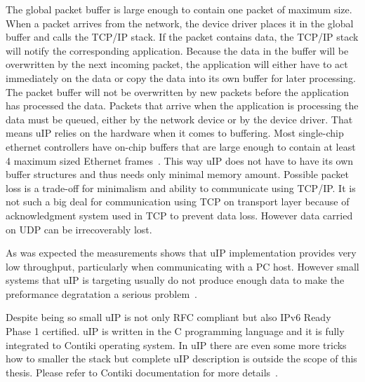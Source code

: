 The global packet buffer is large enough to contain one packet of maximum size.
When a packet arrives from the network, the device driver places it in the
global buffer and calls the TCP/IP stack.
If the packet contains data, the TCP/IP stack will notify the corresponding application.
Because the data in the buffer will be overwritten by the next incoming packet,
the application will either have to act immediately on the data or copy the data into
its own buffer for later processing.
The packet buffer will not be overwritten by new packets before the application has processed the data.
Packets that arrive when the application is processing the data must be queued,
either by the network device or by the device driver.
That means uIP relies on the hardware when it comes to buffering.
Most single-chip ethernet controllers have on-chip buffers
that are large enough to contain at least 4 maximum sized Ethernet frames~\cite{contiki-docs}.
This way uIP does not have to have its own buffer structures and thus
needs only minimal memory amount.
Possible packet loss is a trade-off for minimalism and ability to communicate using TCP/IP.
It is not such a big deal for communication using TCP on transport layer
because of acknowledgment system used in TCP to prevent data loss.
However data carried on UDP can be irrecoverably lost.

As was expected the measurements shows that uIP implementation provides very low
throughput, particularly when communicating with a PC host.
However small systems that uIP is targeting usually do not produce enough data
to make the preformance degratation a serious problem~\cite{thesis-towards}.

Despite being so small uIP is not only RFC compliant but also IPv6 Ready Phase 1 certified.
uIP is written in the C programming language and it is fully integrated to Contiki operating system.
In uIP there are even some more tricks how to smaller the stack
but complete uIP description is outside the scope of this thesis.
Please refer to Contiki documentation for more details~\cite{contiki-docs}.
